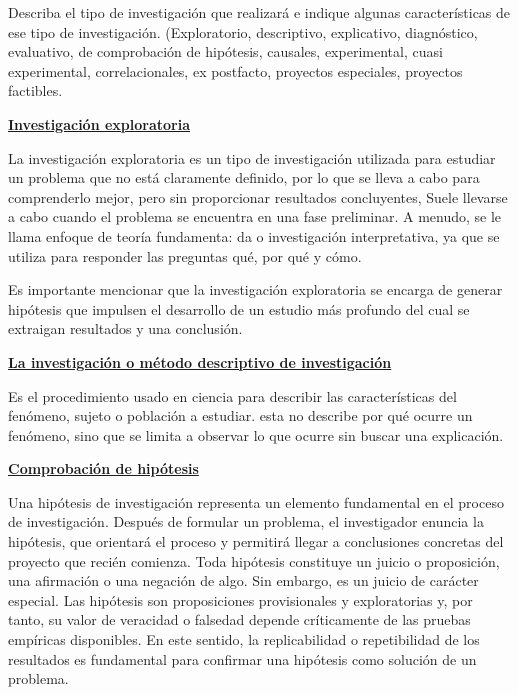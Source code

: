 \documentclass[12pt, a4paper, nofontenc, numbers=endperiod]{apa7}
\begin{document}
{\setlength{\parindent}{1.27cm}Describa el tipo de investigación que realizará e indique algunas características de ese tipo de investigación. (Exploratorio, descriptivo, explicativo, diagnóstico, evaluativo, de 
\newpage
\restoregeometry
\setlength{\parindent}{0cm}comprobación de hipótesis, causales, experimental, cuasi experimental, correlacionales, ex postfacto, proyectos especiales, proyectos factibles.

\textbf{\underline{Investigación exploratoria}} 
	
\setlength{\parindent}{1.27cm}La investigación exploratoria es un tipo de investigación utilizada para estudiar un problema que no está claramente definido, por lo que se lleva a cabo para comprenderlo mejor, pero sin proporcionar resultados concluyentes, Suele llevarse a cabo cuando el problema se encuentra en una fase preliminar. A menudo, se le llama enfoque de teoría fundamenta: da o investigación interpretativa, ya que se utiliza para responder las preguntas qué, por qué y cómo.

\setlength{\parindent}{1.27cm}Es importante mencionar que la investigación exploratoria se encarga de generar hipótesis que impulsen el desarrollo de un estudio más profundo del cual se extraigan resultados y una conclusión. 

\setlength{\parindent}{0cm}\textbf{\underline{La investigación o método descriptivo de investigación}} 

\setlength{\parindent}{1.27cm}Es el procedimiento usado en ciencia para describir las características del fenómeno, sujeto o población a estudiar. esta no describe por qué ocurre un fenómeno, sino que se limita a observar lo que ocurre sin buscar una explicación.
		
\setlength{\parindent}{0cm}\textbf{\underline{Comprobación de hipótesis}} 
			
\setlength{\parindent}{1.27cm}Una hipótesis de investigación representa un elemento fundamental en el proceso de investigación. Después de formular un problema, el investigador enuncia la hipótesis, que orientará el proceso y permitirá llegar a conclusiones concretas del proyecto que recién comienza. Toda hipótesis constituye un juicio o proposición, una afirmación o una negación de algo. Sin embargo, es un juicio de carácter especial. Las hipótesis son proposiciones provisionales y exploratorias y, por tanto, su valor de veracidad o falsedad depende críticamente de las pruebas empíricas disponibles. En este sentido, la replicabilidad o repetibilidad de los resultados es fundamental para confirmar una hipótesis como solución de un problema.

}
\end{document}
